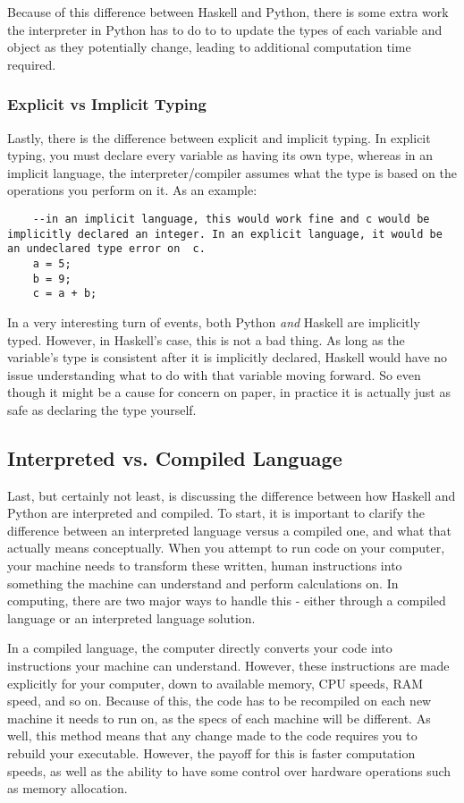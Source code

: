 \documentclass{article}
\begin{document}
    \medskip\noindent Because of this difference between Haskell and Python, there is some extra work the interpreter in Python has to do to to update the types of each variable and object as they potentially change, leading to additional computation time required. 
    
    \subsubsection{Explicit vs Implicit Typing}
    Lastly, there is the difference between explicit and implicit typing. In explicit typing, you must declare every variable as having its own type, whereas in an implicit language, the interpreter/compiler assumes what the type is based on the operations you perform on it. As an example: 
    
    \begin{lstlisting}
    --in an implicit language, this would work fine and c would be implicitly declared an integer. In an explicit language, it would be an undeclared type error on  c. 
    a = 5;
    b = 9;
    c = a + b;
    \end{lstlisting}
    
    \medskip\noindent In a very interesting turn of events, both Python \textit{and} Haskell are implicitly typed. However, in Haskell's case, this is not a bad thing. As long as the variable's type is consistent after it is implicitly declared, Haskell would have no issue understanding what to do with that variable moving forward. So even though it might be a cause for concern on paper, in practice it is actually just as safe as declaring the type yourself.  

    \subsection{Interpreted vs. Compiled Language}
    Last, but certainly not least, is discussing the difference between how Haskell and Python are interpreted and compiled. To start, it is important to clarify the difference between an interpreted language versus a compiled one, and what that actually means conceptually. When you attempt to run code on your computer, your machine needs to transform these written, human instructions into something the machine can understand and perform calculations on. In computing, there are two major ways to handle this - either through a compiled language or an interpreted language solution. 
    
    \medskip\noindent In a compiled language, the computer directly converts your code into instructions your machine can understand. However, these instructions are made explicitly for your computer, down to available memory, CPU speeds, RAM speed, and so on. Because of this, the code has to be recompiled on each new machine it needs to run on, as the specs of each machine will be different. As well, this method means that any change made to the code requires you to rebuild your executable. However, the payoff for this is faster computation speeds, as well as the ability to have some control over hardware operations such as memory allocation. 
    
\end{document}
